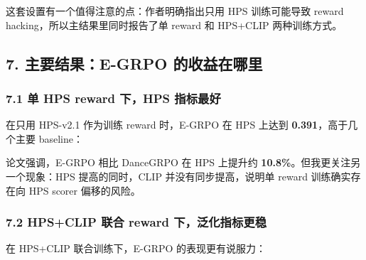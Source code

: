 这套设置有一个值得注意的点：作者明确指出只用 HPS 训练可能导致 reward hacking，所以主结果里同时报告了单 reward 和 HPS+CLIP 两种训练方式。

\subsection{7. 主要结果：E-GRPO 的收益在哪里}

\subsubsection{7.1 单 HPS reward 下，HPS 指标最好}

在只用 HPS-v2.1 作为训练 reward 时，E-GRPO 在 HPS 上达到 \textbf{0.391}，高于几个主要 baseline：

\begin{center}
\end{center}

论文强调，E-GRPO 相比 DanceGRPO 在 HPS 上提升约 \textbf{10.8\%}。但我更关注另一个现象：HPS 提高的同时，CLIP 并没有同步提高，说明单 reward 训练确实存在向 HPS scorer 偏移的风险。

\subsubsection{7.2 HPS+CLIP 联合 reward 下，泛化指标更稳}

在 HPS+CLIP 联合训练下，E-GRPO 的表现更有说服力：

